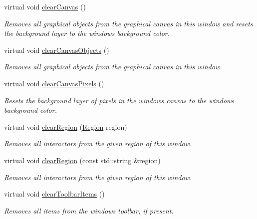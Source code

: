 \begin{DoxyCompactItemize}
virtual void \mbox{\hyperlink{classsgl_1_1GWindow_a8c64b6dc10f111538780ddca425a1693}{clear\+Canvas}} ()
\begin{DoxyCompactList}\small\item\em Removes all graphical objects from the graphical canvas in this window and resets the background layer to the window\textquotesingle{}s background color. \end{DoxyCompactList}\item 
virtual void \mbox{\hyperlink{classsgl_1_1GWindow_a7d6e3e87568ed9962d29a0c9337c4b87}{clear\+Canvas\+Objects}} ()
\begin{DoxyCompactList}\small\item\em Removes all graphical objects from the graphical canvas in this window. \end{DoxyCompactList}\item 
virtual void \mbox{\hyperlink{classsgl_1_1GWindow_a0c30950304fa997055183be1d212a262}{clear\+Canvas\+Pixels}} ()
\begin{DoxyCompactList}\small\item\em Resets the background layer of pixels in the window\textquotesingle{}s canvas to the window\textquotesingle{}s background color. \end{DoxyCompactList}\item 
virtual void \mbox{\hyperlink{classsgl_1_1GWindow_a47f0cc45498a78757fa4d0e6befc2981}{clear\+Region}} (\mbox{\hyperlink{classsgl_1_1GWindow_a81a01a86de31071a92e6cce0bab9bc4b}{Region}} region)
\begin{DoxyCompactList}\small\item\em Removes all interactors from the given region of this window. \end{DoxyCompactList}\item 
virtual void \mbox{\hyperlink{classsgl_1_1GWindow_aeba526cb4d6d6f3d8d6f376656af8dc8}{clear\+Region}} (const std\+::string \&region)
\begin{DoxyCompactList}\small\item\em Removes all interactors from the given region of this window. \end{DoxyCompactList}\item 
virtual void \mbox{\hyperlink{classsgl_1_1GWindow_a7f7fac3c967032599677ee0087af2220}{clear\+Toolbar\+Items}} ()
\begin{DoxyCompactList}\small\item\em Removes all items from the window\textquotesingle{}s toolbar, if present. \end{DoxyCompactList}\item 

\end{DoxyCompactItemize}
